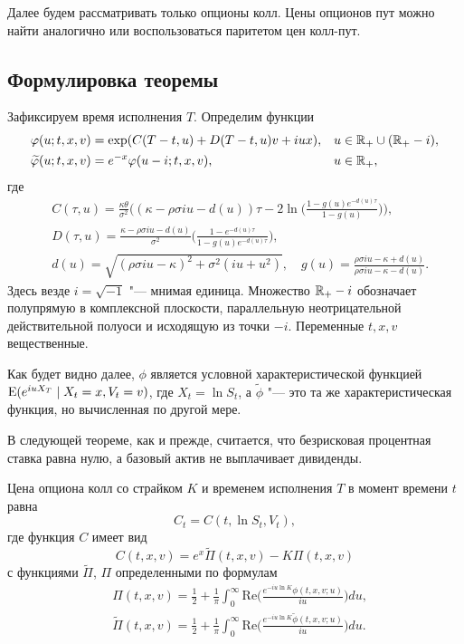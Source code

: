 Далее будем рассматривать только опционы колл.
Цены опционов пут можно найти аналогично или воспользоваться паритетом цен колл-пут.


\subsection{Формулировка теоремы}
\label{hes:s:stetement}

Зафиксируем время исполнения $T$. Определим функции
\begin{align*}
&\varphi(u;t,x,v) = \exp(C(T-t,u) + D(T-t,u)v + iu x),& &u\in\mathbb{R}_+ \cup (\mathbb{R}_+-i),\\
&\widetilde {\varphi}(u;t,x,v) = e^{-x}\varphi(u-i;t,x,v),& &u\in\mathbb{R}_+,
\end{align*}
где
\begin{align}
\label{hes:C}
&C(\tau,u) = \frac{\kappa\theta}{\sigma^2}
  \biggl(
    (\kappa- \rho\sigma iu - d(u))\tau 
    - 2\ln\biggl(\frac{1-g(u)e^{-d(u)\tau}}{1-g(u)}\biggr)
  \biggr),\\
\label{hes:D}
&D(\tau,u) = \frac{\kappa - \rho\sigma i u - d(u)}{\sigma^2}
  \biggl(\frac{1-e^{-d(u)\tau}}{1-g(u)e^{-d(u)\tau}}\biggr),\\
\label{hes:dg}
&d(u)=\sqrt{(\rho\sigma iu - \kappa)^2 + \sigma^2(iu + u^2)},\quad
  g(u) = \frac{\rho\sigma iu- \kappa +d(u)}{\rho\sigma iu - \kappa -d(u)}.
\end{align}
Здесь везде $i=\sqrt{-1}$ "--- мнимая единица. Множество $\mathbb{R}_+-i$ обозначает полупрямую в комплексной плоскости, параллельную неотрицательной действительной полуоси и исходящую из точки $-i$.
Переменные $t,x,v$ вещественные.

Как будет видно далее, $\phi$ является условной характеристической функцией $\operatorname{E} (e^{iu X_T}\mid X_t=x, V_t=v)$, где $X_t=\ln S_t$, а $\tilde \phi$ "--- это та же характеристическая функция, но вычисленная по другой мере.

В следующей теореме, как и прежде, считается, что безрисковая процентная ставка равна нулю, а базовый актив не выплачивает дивиденды.

\begin{theorem}
\label{hes:t:formula}
Цена опциона колл со страйком $K$ и временем исполнения $T$ в момент времени $t$ равна
\begin{equation}
\label{hes:call-repr}
C_t = C(t,\ln S_t,V_t),
\end{equation}
где функция $C$ имеет вид
\begin{equation}
\label{hes:call-undiscounted}
C(t,x,v) = e^x \tilde \Pi(t,x,v) - K \Pi(t,x,v)
\end{equation}
с функциями $\tilde\Pi$, $\Pi$ определенными по формулам
\begin{align}
\label{hes:pi}
&\Pi(t,x,v) = \frac12 + \frac1\pi \int_0^\infty
  \mathrm{Re}\biggl(\frac{e^{-iu \ln K}\phi(t,x,v;u)}{iu}\biggr) du,\\[0.5em]
\label{hes:pit}
&\tilde\Pi(t,x,v) = \frac12 + \frac1\pi \int_0^\infty
  \mathrm{Re}\biggl(\frac{e^{-iu \ln K}\tilde \phi(t,x,v;u)}{iu}\biggr) du.
\end{align}
\end{theorem}

